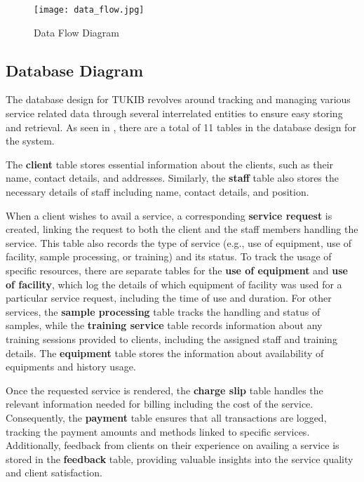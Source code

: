 \begin{figure}[h]
	\centering 
	\texttt{[image: data\_flow.jpg]}
	\caption{Data Flow Diagram}
	\label{fig:data_flow}
\end{figure}

\newpage

\subsection{Database Diagram}

The database design for TUKIB revolves around tracking and managing various service related data through several interrelated entities to ensure easy storing and retrieval. As seen in , there are a total of 11 tables in the database design for the system. 

The \textbf{client} table stores essential information about the clients, such as their name, contact details, and addresses. Similarly, the \textbf{staff} table also stores the necessary details of staff including name, contact details, and position. 


When a client wishes to avail a service, a corresponding \textbf{service request} is created, linking the request to both the client and the staff members handling the service. This table also records the type of service (e.g., use of equipment, use of facility, sample processing, or training) and its status. To track the usage of specific resources, there are separate tables for the \textbf{use of equipment} and \textbf{use of facility}, which log the details of which equipment of facility was used for a particular service request, including the time of use and duration. For other services, the \textbf{sample processing} table tracks the handling and status of samples, while the \textbf{training service} table records information about any training sessions provided to clients, including the assigned staff and training details. The \textbf{equipment} table stores the information about availability of equipments and history usage. 

Once the requested service is rendered, the \textbf{charge slip} table handles the relevant information needed for billing including the cost of the service. Consequently, the \textbf{payment} table ensures that all transactions are logged, tracking the payment amounts and methods linked to specific services. Additionally, feedback from clients on their experience on availing a service is stored in the \textbf{feedback} table, providing valuable insights into the service quality and client satisfaction.

